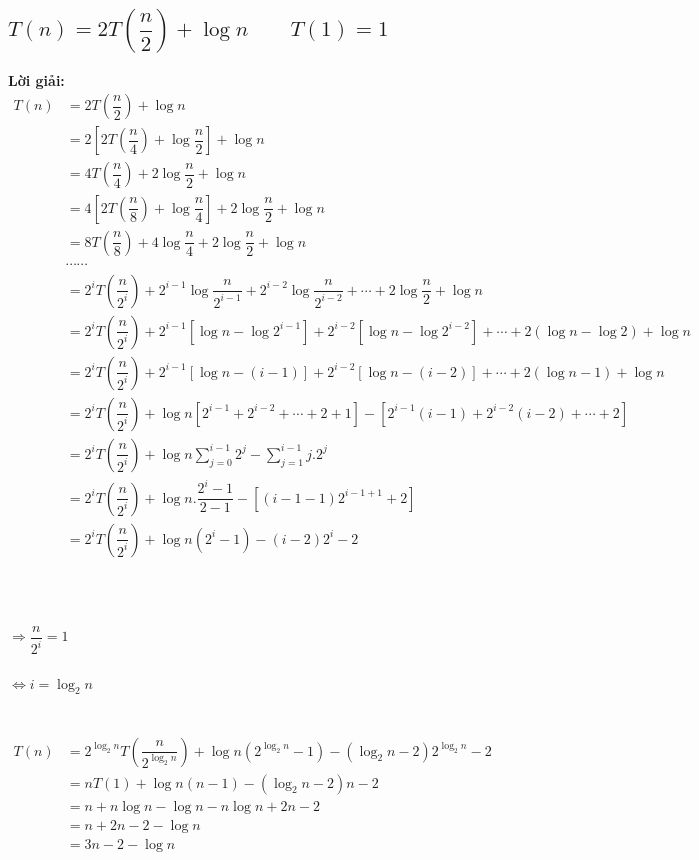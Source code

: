 \documentclass[12pt, letterpaper]{article}
\begin{document}
\subsection{$T(n) = 2T(\dfrac{n}{2}) + \log n \quad \quad T(1) = 1$}
\textbf{Lời giải:} \\
$ \begin{aligned}
    T(n) &= 2T(\dfrac{n}{2}) + \log n \\
        &= 2[2T(\dfrac{n}{4}) + \log \dfrac{n}{2}] + \log n \\
        &= 4T(\dfrac{n}{4}) + 2\log \dfrac{n}{2} + \log n \\
        &= 4[2T(\dfrac{n}{8}) + \log \dfrac{n}{4}] + 2\log \dfrac{n}{2} + \log n \\
        &= 8T(\dfrac{n}{8}) + 4\log \dfrac{n}{4} + 2\log \dfrac{n}{2} + \log n \\
        &\cdots \cdots \\
        &= 2^iT(\dfrac{n}{2^i}) + 2^{i-1}\log \dfrac{n}{2^{i-1}} + 2^{i-2}\log \dfrac{n}{2^{i-2}} + \cdots + 2\log \dfrac{n}{2} + \log n \\
        &= 2^iT(\dfrac{n}{2^i}) + 2^{i-1}[\log n - \log 2^{i-1}] + 2^{i-2}[\log n - \log 2^{i-2}] + \cdots + 2(\log n - \log 2) + \log n \\
        &= 2^iT(\dfrac{n}{2^i}) + 2^{i-1}[\log n - (i-1)] + 2^{i-2}[\log n - (i-2)] + \cdots + 2(\log n - 1) + \log n \\
        &= 2^iT(\dfrac{n}{2^i}) + \log n[2^{i-1} + 2^{i-2} + \cdots + 2 + 1] - [2^{i-1}(i-1) + 2^{i-2}(i-2) + \cdots + 2] \\
        &= 2^iT(\dfrac{n}{2^i}) + \log n \sum_{j=0}^{i-1} 2^j - \sum_{j=1}^{i-1} j.2^j \\
        &= 2^iT(\dfrac{n}{2^i}) + \log n. \dfrac{2^i - 1}{2 - 1} - [(i - 1 - 1)2^{i - 1 + 1} + 2] \\
        &= 2^iT(\dfrac{n}{2^i}) + \log n(2^i - 1) - (i-2)2^i - 2 \\
\end{aligned} $ \\ \\ \\
 \\
$\Rightarrow \dfrac{n}{2^i} = 1$ \\ \\
$\Leftrightarrow i = \log_2{n}$ \\ \\
 \\
$ \begin{aligned}
    T(n) &= 2^{\log_2{n}}T(\dfrac{n}{2^{\log_2{n}}}) + \log n(2^{\log_2{n}} - 1) - (\log_2{n} - 2)2^{\log_2{n}} - 2 \\
        &= nT(1) + \log n(n - 1) - (\log_2{n} - 2)n - 2 \\
        &= n + n\log n - \log n - n\log n + 2n - 2 \\
        &= n + 2n - 2 - \log n\\
        &= 3n - 2 - \log n
\end{aligned} $\\
\end{document}
